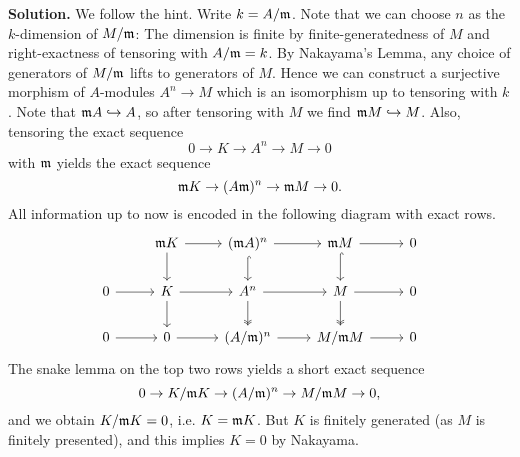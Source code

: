 \documentclass[a4paper,11pt]{article}
\begin{document}
\textbf{Solution.}
We follow the hint. Write $k = A/\mathfrak{m}$. Note that we can choose $n$ as the 
$k$-dimension of $M/\mathfrak{m}$: The dimension is finite by finite-generatedness of $M$ and
right-exactness of tensoring with $A/\mathfrak{m} = k$. By Nakayama's Lemma, any choice of
generators of $M/\mathfrak{m}$ lifts to generators of $M$. Hence we can construct a surjective
morphism of $A$-modules $A^n \to M$ which is an isomorphism up to tensoring
with $k$. Note that $\mathfrak{m} A \hookrightarrow A$, so after tensoring with $M$
we find $\mathfrak{m} M \hookrightarrow M$. Also, tensoring the exact sequence
\begin{equation*}
    0 \to K \to A^n \to M \to 0
\end{equation*}
with $\mathfrak{m}$ yields the exact sequence
\begin{equation*}
    \mathfrak{m} K \to (A \mathfrak{m})^n \to \mathfrak{m} M \to 0.
\end{equation*}
All information up to now is encoded in the following diagram with exact rows.
\begin{equation*}
\begin{tikzcd}[ampersand replacement=\&]
	\& {\fm K} \& {(\fm A)^n} \& {\fm M} \& 0 \\
	0 \& K \& {A^n} \& M \& 0 \\
	0 \& 0 \& {(A/\fm)^n} \& {M/\fm M} \& 0
	\arrow[from=3-1, to=3-2]
	\arrow[from=3-2, to=3-3]
	\arrow[from=3-3, to=3-4]
	\arrow[from=3-4, to=3-5]
	\arrow[from=2-1, to=2-2]
	\arrow[from=2-2, to=2-3]
	\arrow[from=2-3, to=2-4]
	\arrow[from=2-4, to=2-5]
	\arrow[hook, from=1-4, to=2-4]
	\arrow[hook, from=1-3, to=2-3]
	\arrow[two heads, from=2-4, to=3-4]
	\arrow[two heads, from=2-3, to=3-3]
	\arrow[from=2-2, to=3-2]
	\arrow[from=1-2, to=2-2]
	\arrow[from=1-2, to=1-3]
	\arrow[from=1-3, to=1-4]
	\arrow[from=1-4, to=1-5]
\end{tikzcd}
\end{equation*}
The snake lemma on the top two rows yields a short exact sequence
$$0 \to K / \mathfrak{m} K \to (A/\mathfrak{m})^n \to M/\mathfrak{m} M \to 0,$$ and we obtain
$K/\mathfrak{m} K = 0$, i.e. $K = \mathfrak{m} K$. But $K$ is finitely generated (as $M$ is finitely
presented), and this implies $K = 0$ by Nakayama. 
\end{document}
